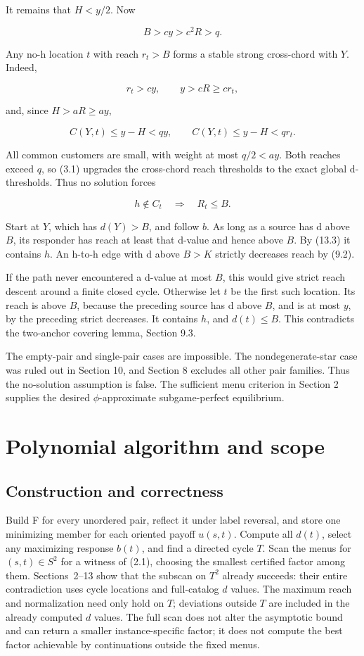 \documentclass[11pt,a4paper]{article}
\begin{document}
It remains that \(H<y/2\). Now

\[
B>cy>c^2R>q. \tag{13.2}
\]

Any no-h location \(t\) with reach \(r_t>B\) forms a stable strong cross-chord with \(Y\). Indeed,

\[
r_t>cy,\qquad y>cR\ge cr_t,
\]

and, since \(H>aR\ge ay\),

\[
C(Y,t)\le y-H<qy,\qquad C(Y,t)\le y-H<qr_t.
\]

All common customers are small, with weight at most \(q/2<a y\). Both reaches exceed \(q\), so (3.1) upgrades the cross-chord reach thresholds to the exact global d-thresholds. Thus no solution forces

\[
h\notin C_t\quad\Longrightarrow\quad R_t\le B. \tag{13.3}
\]

Start at \(Y\), which has \(d(Y)>B\), and follow \(b\). As long as a source has d above \(B\), its responder has reach at least that d-value and hence above \(B\). By (13.3) it contains \(h\). An h-to-h edge with d above \(B>K\) strictly decreases reach by (9.2).

If the path never encountered a d-value at most \(B\), this would give strict reach descent around a finite closed cycle. Otherwise let \(t\) be the first such location. Its reach is above \(B\), because the preceding source has d above \(B\), and is at most \(y\), by the preceding strict decreases. It contains \(h\), and \(d(t)\le B\). This contradicts the two-anchor covering lemma, Section 9.3.

The empty-pair and single-pair cases are impossible. The nondegenerate-star case was ruled out in Section 10, and Section 8 excludes all other pair families. Thus the no-solution assumption is false. The sufficient menu criterion in Section 2 supplies the desired \(\phi\)-approximate subgame-perfect equilibrium.

\hypertarget{scope-and-limitations}{%
\section{Polynomial algorithm and scope}\label{sec:algorithm}}

\subsection{Construction and correctness}
Build F for every unordered pair, reflect it under label reversal, and store
one minimizing member for each oriented payoff $u(s,t)$. Compute all $d(t)$,
select any maximizing response $b(t)$, and find a directed cycle $T$.
Scan the menus for $(s,t)\in S^2$ for a witness of (2.1), choosing the
smallest certified factor among them. Sections~2--13 show that the
subscan on $T^2$ already succeeds: their entire contradiction uses cycle
locations and full-catalog $d$ values. The maximum reach and normalization
need only hold on $T$; deviations outside $T$ are included in the already
computed $d$ values. The full scan does not alter the asymptotic bound and
can return a smaller instance-specific factor; it does not compute the
best factor achievable by continuations outside the fixed menus.
\end{document}

